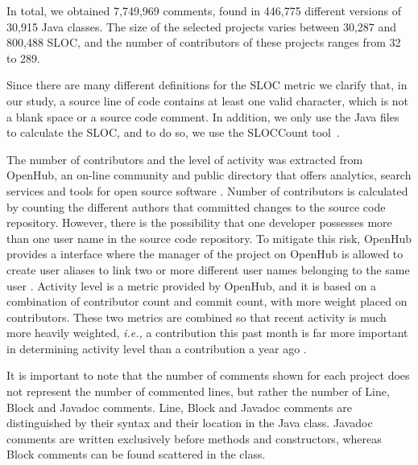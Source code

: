 In total, we obtained 7,749,969 comments, found in 446,775 different versions of 30,915 Java classes. The size of the selected projects varies between 30,287 and 800,488 SLOC, and the number of contributors of these projects ranges from 32 to 289. 

Since there are many different definitions for the SLOC metric we clarify that, in our study, a source line of code contains at least one valid character, which is not a blank space or a source code comment. In addition, we only use the Java files to calculate the SLOC, and to do so, we use the SLOCCount tool~\cite{wheeler2004:home}. 

The number of contributors and the level of activity was extracted from OpenHub, an on-line community and public directory that offers analytics, search services and tools for open source software \cite{Openhub:home}. Number of contributors is calculated by counting the different authors that committed changes to the source code repository. However, there is the possibility that one developer possesses more than one user name in the source code repository. To mitigate this risk, OpenHub provides a interface where the manager of the project on OpenHub is allowed to create user aliases to link two or more different user names belonging to the same user \cite{Openhub:Aliases}. Activity level is a metric provided by OpenHub, and it is based on a combination of contributor count and commit count, with more weight placed on contributors. These two metrics are combined so that recent activity is much more heavily weighted, \textit{i.e.,} a contribution this past month is far more important in determining activity level than a contribution a year ago \cite{Openhub:activity_level}. 

It is important to note that the number of comments shown for each project does not represent the number of commented lines, but rather the number of Line, Block and Javadoc comments. Line, Block and Javadoc comments are distinguished by their syntax and their location in the Java class. Javadoc comments are written exclusively before methods and constructors, whereas Block comments can be found scattered in the class.  

